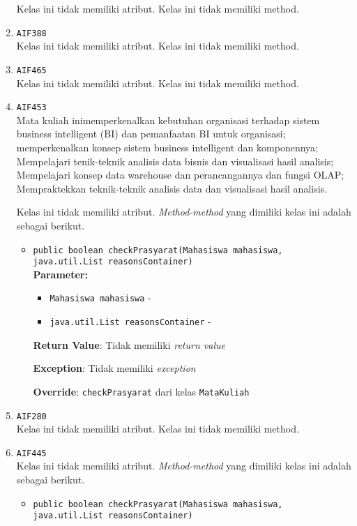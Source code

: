 \documentclass{article}
\begin{document}
\begin{enumerate}
Kelas ini tidak memiliki atribut. Kelas ini tidak memiliki method. \item \texttt{AIF388}\\ 


Kelas ini tidak memiliki atribut. Kelas ini tidak memiliki method. \item \texttt{AIF465}\\ 


Kelas ini tidak memiliki atribut. Kelas ini tidak memiliki method. \item \texttt{AIF453}\\ 
Mata kuliah inimemperkenalkan kebutuhan organisasi terhadap sistem business
 intelligent (BI) dan pemanfaatan BI untuk organisasi; memperkenalkan konsep
 sistem business intelligent dan komponennya; Mempelajari tenik-teknik
 analisis data bisnis dan visualisasi hasil analisis; Mempelajari konsep data
 warehouse dan perancangannya dan fungsi OLAP; Mempraktekkan teknik-teknik
 analisis data dan visualisasi hasil analisis.

Kelas ini tidak memiliki atribut. \textit{Method-method} yang dimiliki kelas ini adalah sebagai berikut.
\begin{itemize}
\item \texttt{public boolean checkPrasyarat(Mahasiswa mahasiswa, java.util.List reasonsContainer)}\\ 


\textbf{Parameter:}\begin{itemize}
\item \texttt{Mahasiswa mahasiswa} - 
\item \texttt{java.util.List reasonsContainer} - 
\end{itemize}
\textbf{Return Value}: Tidak memiliki \textit{return value}

\textbf{Exception}: Tidak memiliki \textit{exception}

\textbf{Override}: \texttt{checkPrasyarat} dari kelas \texttt{MataKuliah}

\end{itemize}
\item \texttt{AIF280}\\ 


Kelas ini tidak memiliki atribut. Kelas ini tidak memiliki method. \item \texttt{AIF445}\\ 


Kelas ini tidak memiliki atribut. \textit{Method-method} yang dimiliki kelas ini adalah sebagai berikut.
\begin{itemize}
\item \texttt{public boolean checkPrasyarat(Mahasiswa mahasiswa, java.util.List reasonsContainer)}\\ 



\end{itemize}
\end{enumerate}
\end{document}
